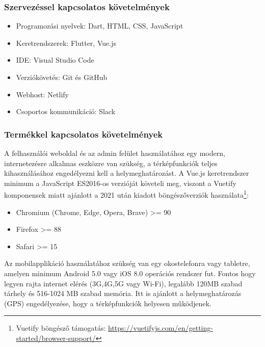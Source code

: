 \subsubsection{Szervezéssel kapcsolatos követelmények}

\begin{itemize}
  \item Programozási nyelvek: Dart, HTML, CSS, JavaScript
  \item Keretrendszerek: Flutter, Vue.js
  \item IDE: Visual Studio Code
  \item Verziókövetés: Git és GitHub
  \item Webhost: Netlify
  \item Csoportos kommunikáció: Slack
\end{itemize}

\subsubsection{Termékkel kapcsolatos követelmények}

A felhasználói weboldal és az admin felület használatához egy modern, internetezésre alkalmas eszközre van szükség, a térképfunkciók teljes kihasználásához engedélyezni kell a helymeghatározást. A Vue.js keretrendszer minimum a JavaScript ES2016-os verzióját követeli meg, viszont a Vuetify komponensek miatt ajánlott a 2021 után kiadott böngészőverziók használata\footnote{Vuetify böngésző támogatás: \url{https://vuetifyjs.com/en/getting-started/browser-support/}}:
\begin{itemize}
  \item Chromium (Chrome, Edge, Opera, Brave) >= 90
  \item Firefox >= 88
  \item Safari >= 15
\end{itemize}

Az mobilapplikáció használatához szükség van egy okostelefonra vagy tabletre,
amelyen minimum Android 5.0 vagy iOS 8.0 operációs rendszer fut. Fontos hogy legyen
rajta internet elérés (3G,4G,5G vagy Wi-Fi), legalább 120MB szabad tárhely és 516-1024 MB szabad memória. Itt is ajánlott a helymeghatározás (GPS) engedélyezése, hogy a térképfunkciók helyesen működjenek.

